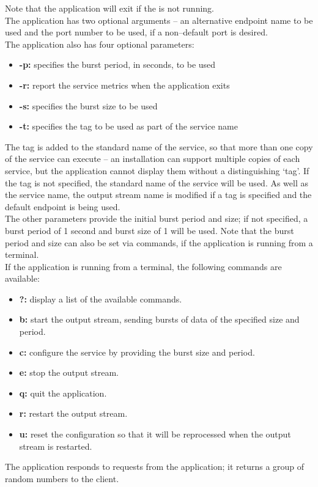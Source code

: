 Note that the application will exit if the
 is not running.\\

The application has two optional arguments -- an alternative endpoint name to be used and
the port number to be used, if a non--default port is desired.\\

The application also has four optional parameters:
\begin{itemize}
\item \textbf{-p:} specifies the burst period, in seconds, to be used 
\item \textbf{-r:} report the service metrics when the application exits
\item \textbf{-s:} specifies the burst size to be used
\item \textbf{-t:} specifies the tag to be used as part of the service name
\end{itemize}
The tag is added to the standard name of the service, so that more than one copy of the
service can execute -- an \mplusm{} installation can support multiple copies of each
 service, but the 
application cannot display them without a distinguishing `tag'.
If the tag is not specified, the standard name of the service will be used.
As well as the service name, the output stream name is modified if a tag is specified and
the default endpoint is being used.\\

The other parameters provide the initial burst period and size; if not specified, a burst
period of 1 second and burst size of 1 will be used.
Note that the burst period and size can also be set via commands, if the application is
running from a terminal.\\

If the application is running from a terminal, the following commands are available:
\begin{itemize}
\item \textbf{?:} display a list of the available commands.
\item \textbf{b:} start the output stream, sending bursts of data of the specified size
and period. 
\item \textbf{c:} configure the service by providing the burst size and period. 
\item \textbf{e:} stop the output stream. 
\item \textbf{q:} quit the application. 
\item \textbf{r:} restart the output stream. 
\item \textbf{u:} reset the configuration so that it will be reprocessed when the output
stream is restarted. 
\end{itemize}
The  application responds to
 requests from the
 application; it returns a group of random
numbers to the client.\\

